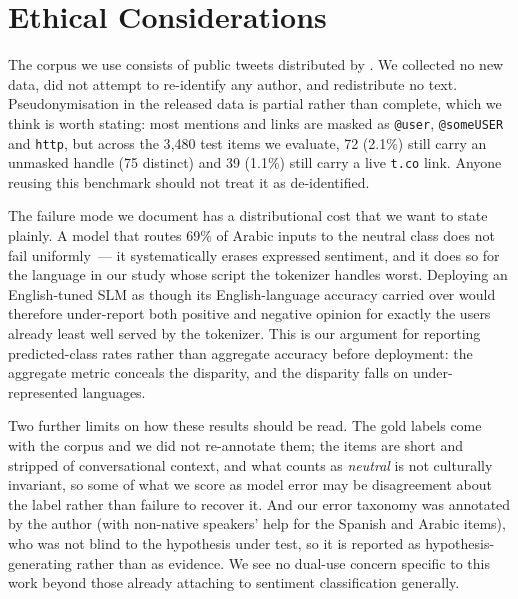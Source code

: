 \documentclass[11pt]{article}
\begin{document}
\section*{Ethical Considerations}

The corpus we use consists of public tweets distributed by
\citet{barbieri2022xlmt}. We collected no new data, did not attempt to
re-identify any author, and redistribute no text. Pseudonymisation in the released
data is partial rather than complete, which we think is worth stating: most
mentions and links are masked as \texttt{@user}, \texttt{@someUSER} and
\texttt{http}, but across the 3{,}480 test items we evaluate, 72 (2.1\%) still
carry an unmasked handle (75 distinct) and 39 (1.1\%) still carry a live
\texttt{t.co} link. Anyone reusing this benchmark should not treat it as
de-identified.

The failure mode we document has a distributional cost that we want to state
plainly. A model that routes 69\% of Arabic inputs to the neutral class does not
fail uniformly~--- it systematically erases expressed sentiment, and it does so
for the language in our study whose script the tokenizer handles worst. Deploying
an English-tuned SLM as though its English-language accuracy carried over would
therefore under-report both positive and negative opinion for exactly the users
already least well served by the tokenizer. This is our argument for reporting
predicted-class rates rather than aggregate accuracy before deployment: the
aggregate metric conceals the disparity, and the disparity falls on
under-represented languages.

Two further limits on how these results should be read. The gold labels come with
the corpus and we did not re-annotate them; the items are short and stripped of
conversational context, and what counts as \emph{neutral} is not culturally
invariant, so some of what we score as model error may be disagreement about the
label rather than failure to recover it. And our
error taxonomy was annotated by the author (with non-native speakers'
help for the Spanish and Arabic items), who was not blind to the hypothesis under
test, so it is reported as hypothesis-generating rather than as
evidence. We see no dual-use concern specific to this work beyond those already
attaching to sentiment classification generally.


\end{document}
